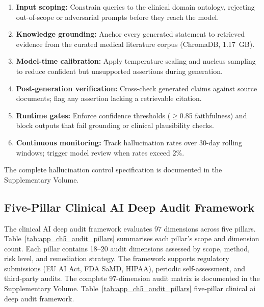 \begin{enumerate}[leftmargin=*, itemsep=3pt]
    \item \textbf{Input scoping:} Constrain queries to the clinical domain ontology, rejecting out-of-scope or adversarial prompts before they reach the model.
    \item \textbf{Knowledge grounding:} Anchor every generated statement to retrieved evidence from the curated medical literature corpus (ChromaDB, 1.17~GB).
    \item \textbf{Model-time calibration:} Apply temperature scaling and nucleus sampling to reduce confident but unsupported assertions during generation.
    \item \textbf{Post-generation verification:} Cross-check generated claims against source documents; flag any assertion lacking a retrievable citation.
    \item \textbf{Runtime gates:} Enforce confidence thresholds ($\geq$0.85 faithfulness) and block outputs that fail grounding or clinical plausibility checks.
    \item \textbf{Continuous monitoring:} Track hallucination rates over 30-day rolling windows; trigger model review when rates exceed 2\%.
\end{enumerate}

\noindent The complete hallucination control specification is documented in the Supplementary Volume.


\subsection{Five-Pillar Clinical AI Deep Audit Framework}
\label{sec:deep_audit}


The clinical AI deep audit framework evaluates 97 dimensions across five pillars. Table~\ref{tab:app_ch5_audit_pillars} summarises each pillar's scope and dimension count. Each pillar contains 18--20 audit dimensions assessed by scope, method, risk level, and remediation strategy. The framework supports regulatory submissions (EU AI Act, FDA SaMD, HIPAA), periodic self-assessment, and third-party audits. The complete 97-dimension audit matrix is documented in the Supplementary Volume.
\noindent Table~\ref{tab:app_ch5_audit_pillars} five-pillar clinical ai deep audit framework.

